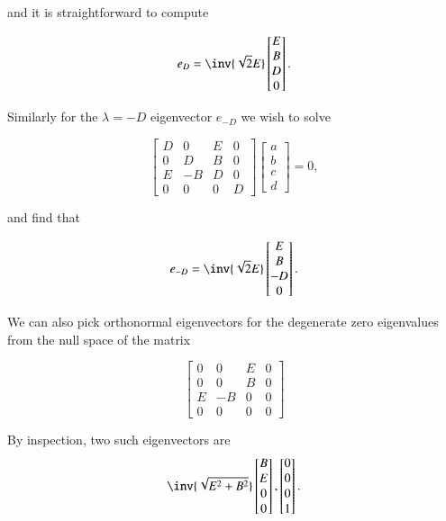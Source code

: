 and it is straightforward to compute

\begin{equation}\label{eqn:relElectroDynProblemSet2:610}
e_D = 
\inv{\sqrt{2}E}
\begin{bmatrix} 
E \\
B \\
D \\
0
\end{bmatrix}.
\end{equation}

Similarly for the $\lambda = -D$ eigenvector $e_{-D}$ we wish to solve

\begin{equation}\label{eqn:relElectroDynProblemSet2:630}
\begin{bmatrix}
D & 0 & E & 0 \\
0 & D & B & 0 \\
E & -B & D & 0 \\
0 & 0 & 0 & D
\end{bmatrix} 
\begin{bmatrix} 
a \\
b \\
c \\
d
\end{bmatrix} 
 = 0,
\end{equation}

and find that

\begin{equation}\label{eqn:relElectroDynProblemSet2:650}
e_{-D} = 
\inv{\sqrt{2}E}
\begin{bmatrix} 
E \\
B \\
-D \\
0
\end{bmatrix}.
\end{equation}

We can also pick orthonormal eigenvectors for the degenerate zero eigenvalues from the null space of the matrix

\begin{equation}\label{eqn:relElectroDynProblemSet2:670}
\begin{bmatrix}
0 & 0 & E & 0 \\
0 & 0 & B & 0 \\
E & -B & 0 & 0 \\
0 & 0 & 0 & 0
\end{bmatrix} 
\end{equation}

By inspection, two such eigenvectors are 
\begin{equation}\label{eqn:relElectroDynProblemSet2:690}
\inv{\sqrt{E^2 + B^2}}
\begin{bmatrix} 
B \\
E \\
0 \\
0 
\end{bmatrix},
\begin{bmatrix} 
0 \\
0 \\
0 \\
1 
\end{bmatrix}.
\end{equation}

